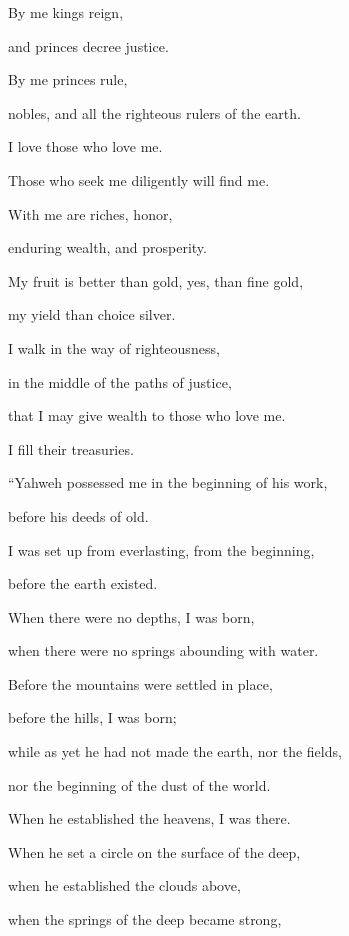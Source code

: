 {\par }{\Q {}By me kings reign,
\par }{\QB and princes decree justice.
\par }{\Q {}By me princes rule,
\par }{\QB nobles, and all the righteous rulers of the earth.
\par }{\Q {}I love those who love me.
\par }{\QB Those who seek me diligently will find me.
\par }{\Q {}With me are riches, honor,
\par }{\QB enduring wealth, and prosperity.
\par }{\Q {}My fruit is better than gold, yes, than fine gold,
\par }{\QB my yield than choice silver.
\par }{\Q {}I walk in the way of righteousness,
\par }{\QB in the middle of the paths of justice,
\par }{\Q {}that I may give wealth to those who love me.
\par }{\QB I fill their treasuries.
\par }{\BB \par }{\Q {}“Yahweh possessed me in the beginning of his work,
\par }{\QB before his deeds of old.
\par }{\Q {}I was set up from everlasting, from the beginning,
\par }{\QB before the earth existed.
\par }{\Q {}When there were no depths, I was born,
\par }{\QB when there were no springs abounding with water.
\par }{\Q {}Before the mountains were settled in place,
\par }{\QB before the hills, I was born;
\par }{\Q {}while as yet he had not made the earth, nor the fields,
\par }{\QB nor the beginning of the dust of the world.
\par }{\Q {}When he established the heavens, I was there.
\par }{\QB When he set a circle on the surface of the deep,
\par }{\Q {}when he established the clouds above,
\par }{\QB when the springs of the deep became strong,
}
